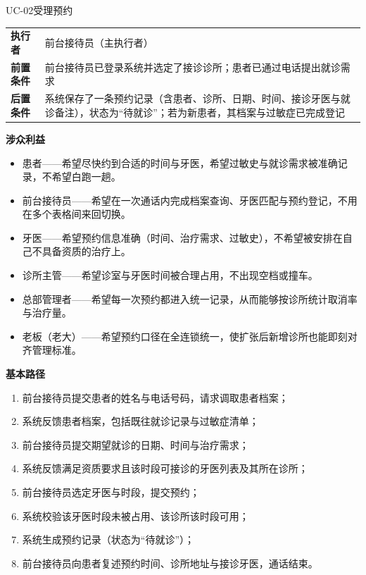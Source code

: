 \documentclass[11pt,a4paper]{ctexart}
\begin{document}
\begin{ucbox}{UC-02\quad 受理预约}
\small
\begin{tabularx}{\linewidth}{@{}L{2.2cm}X@{}}
\toprule
\textbf{\textcolor{adcblue!92}{执行者}} & 前台接待员（主执行者） \\
\textbf{前置条件} & 前台接待员已登录系统并选定了接诊诊所；患者已通过电话提出就诊需求 \\
\textbf{后置条件} & 系统保存了一条预约记录（含患者、诊所、日期、时间、接诊牙医与就诊备注），状态为“待就诊”；若为新患者，其档案与过敏症已完成登记 \\
\bottomrule
\end{tabularx}

\vspace{4pt}
\textbf{涉众利益}
\begin{itemize}[leftmargin=1.4em,topsep=2pt,itemsep=1pt]
  \item 患者——希望尽快约到合适的时间与牙医，希望过敏史与就诊需求被准确记录，不希望白跑一趟。
  \item 前台接待员——希望在一次通话内完成档案查询、牙医匹配与预约登记，不用在多个表格间来回切换。
  \item 牙医——希望预约信息准确（时间、治疗需求、过敏史），不希望被安排在自己不具备资质的治疗上。
  \item 诊所主管——希望诊室与牙医时间被合理占用，不出现空档或撞车。
  \item 总部管理者——希望每一次预约都进入统一记录，从而能够按诊所统计取消率与治疗量。
  \item 老板（老大）——希望预约口径在全连锁统一，使扩张后新增诊所也能即刻对齐管理标准。
\end{itemize}

\vspace{2pt}
\textbf{基本路径}
\begin{enumerate}[leftmargin=1.9em,topsep=2pt,itemsep=1pt]
  \item 前台接待员提交患者的姓名与电话号码，请求调取患者档案；
  \item 系统反馈患者档案，包括既往就诊记录与过敏症清单；
  \item 前台接待员提交期望就诊的日期、时间与治疗需求；
  \item 系统反馈满足资质要求且该时段可接诊的牙医列表及其所在诊所；
  \item 前台接待员选定牙医与时段，提交预约；
  \item 系统校验该牙医时段未被占用、该诊所该时段可用；
  \item 系统生成预约记录（状态为“待就诊”）；
  \item 前台接待员向患者复述预约时间、诊所地址与接诊牙医，通话结束。
\end{enumerate}


\end{ucbox}
\end{document}
